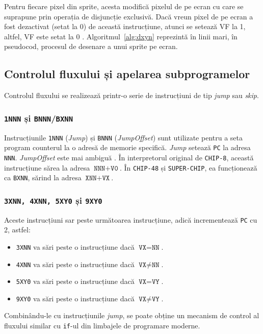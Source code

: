 \documentclass[a4paper]{article}
\begin{document}
Pentru fiecare pixel din sprite, acesta modifică pixelul de pe ecran cu care se suprapune prin operația de disjuncție exclusivă. Dacă vreun pixel
de pe ecran a fost dezactivat (setat la 0) de această instrucțiune, atunci se setează VF la 1, altfel, VF este setat la 0 \cite{langhoff}.
Algoritmul~\ref{alg:dxyn} reprezintă în linii mari, în pseudocod, procesul de desenare a unui sprite pe ecran.

\subsection{Controlul fluxului și apelarea subprogramelor}
Controlul fluxului se realizează printr-o serie de instrucțiuni de tip \textit{jump} sau \textit{skip}.

\subsubsection{\texttt{1NNN} și \texttt{BNNN}/\texttt{BXNN}}
Instrucțiunile \texttt{1NNN} (\textit{Jump}) și \texttt{BNNN} (\textit{JumpOffset}) sunt utilizate pentru a seta program counterul la o adresă
de memorie specifică. \textit{Jump} setează \texttt{PC} la adresa \texttt{NNN}. \textit{JumpOffset} este mai ambiguă \cite{langhoff}. În interpretorul
original de \texttt{CHIP-8}, această instrucțiune sărea la adresa $\texttt{NNN} + \texttt{V0}$. În \texttt{CHIP-48} și \texttt{SUPER-CHIP}, ea funcționează
ca \texttt{BXNN}, sărind la adresa $\texttt{XNN} + \texttt{VX}$.

\subsubsection{\texttt{3XNN, 4XNN, 5XY0} și \texttt{9XY0}}
Aceste instrucțiuni sar peste următoarea instrucțiune, adică incrementează \texttt{PC} cu 2, astfel:
\begin{itemize}
	\item \texttt{3XNN} va sări peste o instrucțiune dacă $\texttt{VX} = \texttt{NN}$.
	\item \texttt{4XNN} va sări peste o instrucțiune dacă $\texttt{VX} \not = \texttt{NN}$.
	\item \texttt{5XY0} va sări peste o instrucțiune dacă $\texttt{VX} = \texttt{VY}$.
	\item \texttt{9XY0} va sări peste o instrucțiune dacă $\texttt{VX} \not = \texttt{VY}$.
\end{itemize}

Combinându-le cu instrucțiunile \textit{jump}, se poate obține un mecanism de control al fluxului similar cu \texttt{if}-ul din limbajele de programare moderne.
\end{document}
